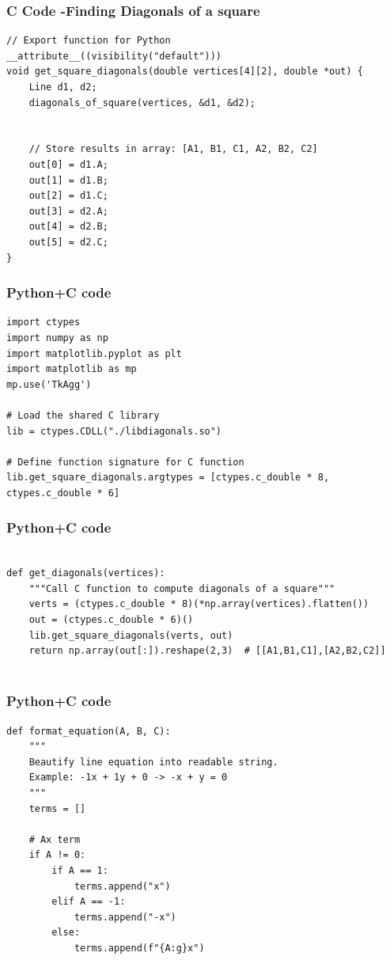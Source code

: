 \documentclass{beamer}
\begin{document}
\begin{frame}[fragile]
    \frametitle{C Code -Finding Diagonals of a square}

    \begin{lstlisting}
// Export function for Python
__attribute__((visibility("default"))) 
void get_square_diagonals(double vertices[4][2], double *out) {
    Line d1, d2;
    diagonals_of_square(vertices, &d1, &d2);


    // Store results in array: [A1, B1, C1, A2, B2, C2]
    out[0] = d1.A;
    out[1] = d1.B;
    out[2] = d1.C;
    out[3] = d2.A;
    out[4] = d2.B;
    out[5] = d2.C;
}

    \end{lstlisting}
\end{frame}

\begin{frame}[fragile]
    \frametitle{Python+C code}

    \begin{lstlisting}
import ctypes
import numpy as np
import matplotlib.pyplot as plt
import matplotlib as mp
mp.use('TkAgg')

# Load the shared C library
lib = ctypes.CDLL("./libdiagonals.so")

# Define function signature for C function
lib.get_square_diagonals.argtypes = [ctypes.c_double * 8, ctypes.c_double * 6]

    \end{lstlisting}
\end{frame}

\begin{frame}[fragile]
    \frametitle{Python+C code}

    \begin{lstlisting}

def get_diagonals(vertices):
    """Call C function to compute diagonals of a square"""
    verts = (ctypes.c_double * 8)(*np.array(vertices).flatten())
    out = (ctypes.c_double * 6)()
    lib.get_square_diagonals(verts, out)
    return np.array(out[:]).reshape(2,3)  # [[A1,B1,C1],[A2,B2,C2]]


    \end{lstlisting}
\end{frame}

\begin{frame}[fragile]
    \frametitle{Python+C code}

    \begin{lstlisting}
def format_equation(A, B, C):
    """
    Beautify line equation into readable string.
    Example: -1x + 1y + 0 -> -x + y = 0
    """
    terms = []

    # Ax term
    if A != 0:
        if A == 1:
            terms.append("x")
        elif A == -1:
            terms.append("-x")
        else:
            terms.append(f"{A:g}x")

    \end{lstlisting}
\end{frame}
\end{document}
